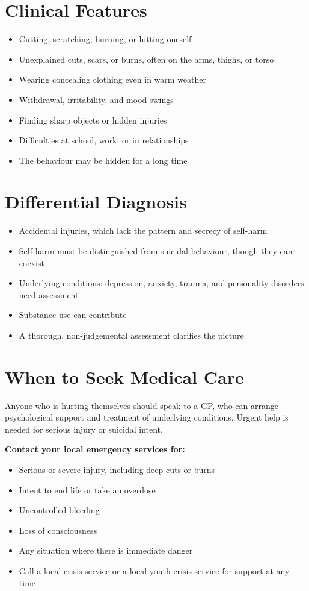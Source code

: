 \section*{Clinical Features}
\begin{itemize}
    \item Cutting, scratching, burning, or hitting oneself
    \item Unexplained cuts, scars, or burns, often on the arms, thighs, or torso
    \item Wearing concealing clothing even in warm weather
    \item Withdrawal, irritability, and mood swings
    \item Finding sharp objects or hidden injuries
    \item Difficulties at school, work, or in relationships
    \item The behaviour may be hidden for a long time
\end{itemize}

\section*{Differential Diagnosis}
\begin{itemize}
    \item Accidental injuries, which lack the pattern and secrecy of self-harm
    \item Self-harm must be distinguished from suicidal behaviour, though they can coexist
    \item Underlying conditions: depression, anxiety, trauma, and personality disorders need assessment
    \item Substance use can contribute
    \item A thorough, non-judgemental assessment clarifies the picture
\end{itemize}

\section*{When to Seek Medical Care}
Anyone who is hurting themselves should speak to a GP, who can arrange psychological support and treatment of underlying conditions. Urgent help is needed for serious injury or suicidal intent.

\textbf{Contact your local emergency services for:}
\begin{itemize}
    \item Serious or severe injury, including deep cuts or burns
    \item Intent to end life or take an overdose
    \item Uncontrolled bleeding
    \item Loss of consciousness
    \item Any situation where there is immediate danger
    \item Call a local crisis service or a local youth crisis service for support at any time
\end{itemize}

